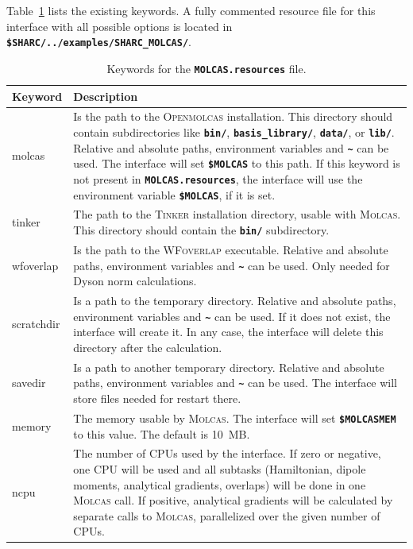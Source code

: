 \documentclass[a4paper,10pt,DIV=15,openany]{scrbook}
\newcommand{\ttt}[1]{\textbf{\texttt{#1}}}
\begin{document}
Table~\ref{tab:molcas_sh2} lists the existing keywords.
A fully commented resource file for this interface with all possible options is located in \ttt{\$SHARC/../examples/SHARC\_MOLCAS/}.

\begin{table}
  \centering
  \caption{Keywords for the \ttt{MOLCAS.resources} file.}
  \label{tab:molcas_sh2}
  \begin{tabular}{>{\ttfamily}lp{12cm}}
  \hline
  Keyword       &Description\\
  \hline
molcas          &Is the path to the \textsc{Openmolcas} installation. This directory should contain subdirectories like \ttt{bin/}, \ttt{basis\_library/}, \ttt{data/}, or \ttt{lib/}. Relative and absolute paths, environment variables and \ttt{\textasciitilde} can be used. The interface will set \ttt{\$MOLCAS} to this path. If this keyword is not present in \ttt{MOLCAS.resources}, the interface will use the environment variable \ttt{\$MOLCAS}, if it is set.\\
tinker          &The path to the \textsc{Tinker} installation directory, usable with \textsc{Molcas}. This directory should contain the \ttt{bin/} subdirectory.\\
wfoverlap       &Is the path to the \textsc{WFoverlap} executable. Relative and absolute paths, environment variables and \ttt{\textasciitilde} can be used. Only needed for Dyson norm calculations.\\
scratchdir      &Is a path to the temporary directory. Relative and absolute paths, environment variables and \ttt{\textasciitilde} can be used. If it does not exist, the interface will create it. In any case, the interface will delete this directory after the calculation.\\
savedir         &Is a path to another temporary directory.  Relative and absolute paths, environment variables and \ttt{\textasciitilde} can be used. The interface will store files needed for restart there.\\
memory          &The memory usable by \textsc{Molcas}. The interface will set \ttt{\$MOLCASMEM} to this value. The default is 10~MB.\\
ncpu            &The number of CPUs used by the interface. If zero or negative, one CPU will be used and all subtasks (Hamiltonian, dipole moments, analytical gradients, overlaps) will be done in one \textsc{Molcas} call. If positive, analytical gradients will be calculated by separate calls to \textsc{Molcas}, parallelized over the given number of CPUs. \\

\end{tabular}
\end{table}
\end{document}
